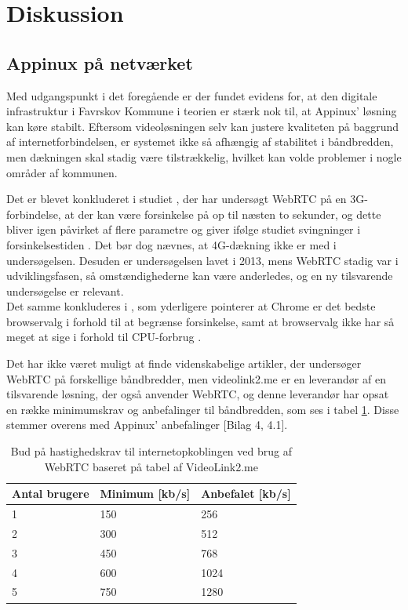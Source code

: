 \section{Diskussion}
\subsection{Appinux på netværket}
Med udgangspunkt i det foregående er der fundet evidens for, at den digitale infrastruktur i Favrskov Kommune i teorien er stærk nok til, at Appinux' løsning kan køre stabilt. Eftersom videoløsningen selv kan justere kvaliteten på baggrund af internetforbindelsen, er systemet ikke så afhængig af stabilitet i båndbredden, men dækningen skal stadig være tilstrækkelig, hvilket kan volde problemer i nogle områder af kommunen.

Det er blevet konkluderet i studiet , der har undersøgt WebRTC på en 3G-forbindelse, at der kan være forsinkelse på op til næsten to sekunder, og dette bliver igen påvirket af flere parametre og giver ifølge studiet svingninger i forsinkelsestiden \cite{webrtcjournal}. Det bør dog nævnes, at 4G-dækning ikke er med i undersøgelsen. Desuden er undersøgelsen lavet i 2013, mens WebRTC stadig var i udviklingsfasen, så omstændighederne kan være anderledes, og en ny tilsvarende undersøgelse er relevant.\\
Det samme konkluderes i , som yderligere pointerer at Chrome er det bedste browservalg i forhold til at begrænse forsinkelse, samt at browservalg ikke har så meget at sige i forhold til CPU-forbrug \cite{arto}.

Det har ikke været muligt at finde videnskabelige artikler, der undersøger WebRTC på forskellige båndbredder, men videolink2.me er en leverandør af en tilsvarende løsning, der også anvender WebRTC, og denne leverandør har opsat en række minimumskrav og anbefalinger til båndbredden, som ses i tabel \ref{tab:hastighedtabel}. Disse stemmer overens med Appinux' anbefalinger [Bilag 4, 4.1].
\begin{table}[H]
\caption{Bud på hastighedskrav til internetopkoblingen ved brug af WebRTC baseret på tabel af VideoLink2.me \cite{videolink2me}}
\label{tab:hastighedtabel}
\centering
\begin{tabular}{|l|l|l|}
\hline
\textbf{Antal brugere} & \textbf{Minimum} [kb/s]  & \textbf{Anbefalet}  [kb/s] \\ \hline
1             & 150          & 256          \\ \hline
2             & 300          & 512          \\ \hline
3             & 450          & 768          \\ \hline
4             & 600          & 1024          \\ \hline
5             & 750          & 1280          \\ \hline
\end{tabular}

\end{table}

